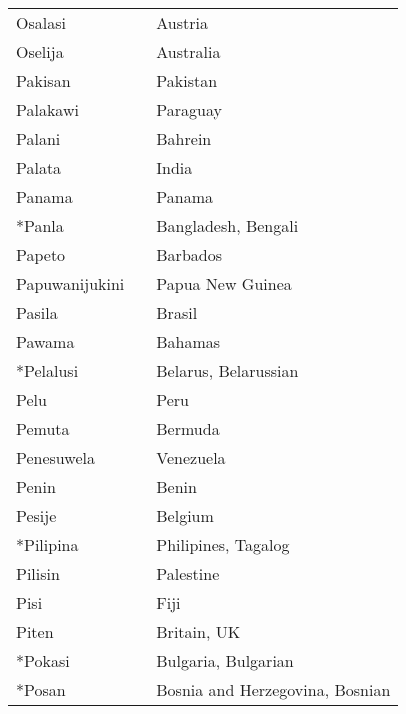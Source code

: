 \begin{supertabular}{p{4,5cm}|ll}
    Osalasi                    &  & Austria                         \\
    Oselija                    &  & Australia                       \\
    Pakisan                    &  & Pakistan                        \\
    Palakawi                   &  & Paraguay                        \\
    Palani                     &  & Bahrein                         \\
    Palata                     &  & India                           \\
    Panama                     &  & Panama                          \\
    *Panla                     &  & Bangladesh, Bengali             \\
    Papeto                     &  & Barbados                        \\
    Papuwanijukini             &  & Papua New Guinea                \\
    Pasila                     &  & Brasil                          \\
    Pawama                     &  & Bahamas                         \\
    *Pelalusi                  &  & Belarus, Belarussian            \\
    Pelu                       &  & Peru                            \\
    Pemuta                     &  & Bermuda                         \\
    Penesuwela                 &  & Venezuela                       \\
    Penin                      &  & Benin                           \\
    Pesije                     &  & Belgium                         \\
    *Pilipina                  &  & Philipines, Tagalog             \\
    Pilisin                    &  & Palestine                       \\
    Pisi                       &  & Fiji                            \\
    Piten                      &  & Britain, UK                     \\
    *Pokasi                    &  & Bulgaria, Bulgarian             \\
    *Posan                     &  & Bosnia and Herzegovina, Bosnian \\

\end{supertabular}
